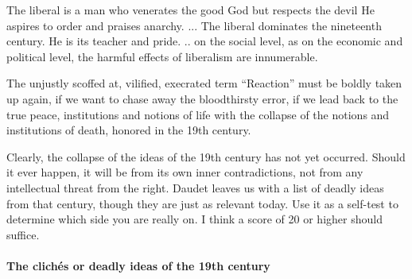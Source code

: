 \begin{quotex}
The liberal is a man who venerates the good God but respects the devil He aspires to order and praises anarchy. ... The liberal dominates the nineteenth century. He is its teacher and pride. .. on the social level, as on the economic and political level, the harmful effects of liberalism are innumerable.

The unjustly scoffed at, vilified, execrated term ``Reaction'' must be boldly taken up again, if we want to chase away the bloodthirsty error, if we lead back to the true peace, institutions and notions of life with the collapse of the notions and institutions of death, honored in the 19th century.
\end{quotex}


Clearly, the collapse of the ideas of the 19th century has not yet occurred. Should it ever happen, it will be from its own inner contradictions, not from any intellectual threat from the right. Daudet leaves us with a list of deadly ideas from that century, though they are just as relevant today. Use it as a self-test to determine which side you are really on. I think a score of 20 or higher should suffice.

\paragraph{The clichés or deadly ideas of the 19th century}


